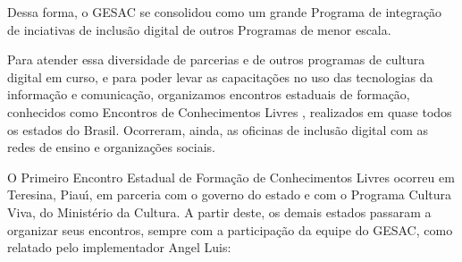 \documentclass[
12pt,		%
openright,	%
twoside,  %
a4paper,			%
chapter=TITLE,		%
english,			%
french,				%
spanish,			%
brazil				%
]{USPSC-classe/USPSC}
\begin{document}
Dessa forma, o GESAC se consolidou como um grande Programa de integra\c{c}\~ao de inciativas de inclus\~ao digital de outros Programas de menor escala.

















Para atender essa diversidade de parcerias e de outros programas de cultura digital em curso, e para poder levar as capacita\c{c}\~oes no uso das tecnologias da informa\c{c}\~ao e comunica\c{c}\~ao, organizamos encontros estaduais de forma\c{c}\~ao, conhecidos como \textquotedbl Encontros de Conhecimentos Livres \textquotedbl , realizados em  quase todos os estados do Brasil. Ocorreram, ainda, as  oficinas de inclus\~ao digital com as redes de ensino e organiza\c{c}\~oes sociais.

















O \textquotedbl Primeiro Encontro Estadual de Forma\c{c}\~ao de Conhecimentos Livres \textquotedbl  ocorreu em  Teresina, Piau\'{\i}, em parceria com o governo do estado e com  o Programa Cultura Viva, do Minist\'erio da Cultura. A partir deste, os demais estados passaram a organizar seus encontros, sempre com a participa\c{c}\~ao da equipe do GESAC, como relatado pelo implementador Angel Luis:


















\noindent\begin{center}\mbox{\centering{}}\end{center}
\end{document}
